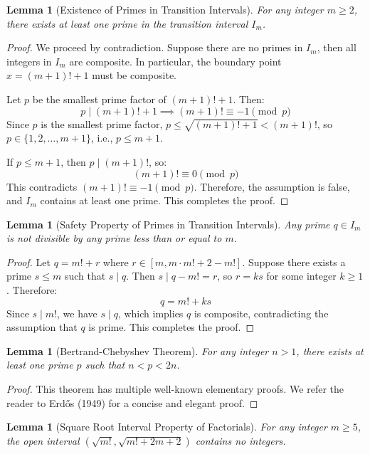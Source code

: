 \documentclass[12pt,letterpaper,reqno]{amsart}
\theoremstyle{plain}
\newtheorem{lemma}[theorem]{Lemma}
\theoremstyle{definition}
\theoremstyle{remark}
\begin{document}
	\begin{lemma}[Existence of Primes in Transition Intervals]
		For any integer $m \ge 2$, there exists at least one prime in the transition interval $I_m$.
	\end{lemma}
	
	\begin{proof}
		We proceed by contradiction. Suppose there are no primes in $I_m$, then all integers in $I_m$ are composite. In particular, the boundary point $x=(m+1)!+1$ must be composite.
		
		Let $p$ be the smallest prime factor of $(m+1)!+1$. Then:
		\[
		p \mid (m+1)!+1 \implies (m+1)! \equiv -1 \pmod{p}
		\]
		Since $p$ is the smallest prime factor, $p \le \sqrt{(m+1)!+1} < (m+1)!$, so $p \in \{1,2,\dots,m+1\}$, i.e., $p \le m+1$.
		
		If $p \le m+1$, then $p \mid (m+1)!$, so:
		\[
		(m+1)! \equiv 0 \pmod{p}
		\]
		This contradicts $(m+1)! \equiv -1 \pmod{p}$. Therefore, the assumption is false, and $I_m$ contains at least one prime. This completes the proof.
	\end{proof}
	
	\begin{lemma}[Safety Property of Primes in Transition Intervals]
		Any prime $q \in I_m$ is not divisible by any prime less than or equal to $m$.
	\end{lemma}
	
	\begin{proof}
		Let $q = m!+r$ where $r \in [m, m \cdot m! + 2 - m!]$. Suppose there exists a prime $s \le m$ such that $s \mid q$. Then $s \mid q - m! = r$, so $r = k s$ for some integer $k \ge 1$. Therefore:
		\[
		q = m! + k s
		\]
		Since $s \mid m!$, we have $s \mid q$, which implies $q$ is composite, contradicting the assumption that $q$ is prime. This completes the proof.
	\end{proof}
	
	\begin{lemma}[Bertrand-Chebyshev Theorem]
		For any integer $n > 1$, there exists at least one prime $p$ such that $n < p < 2n$.
	\end{lemma}
	
	\begin{proof}
		This theorem has multiple well-known elementary proofs. We refer the reader to Erdős (1949) for a concise and elegant proof.
	\end{proof}
	
	\begin{lemma}[Square Root Interval Property of Factorials]
		For any integer $m \ge 5$, the open interval $(\sqrt{m!}, \sqrt{m!+2m+2})$ contains no integers.
	\end{lemma}
	
\end{document}
